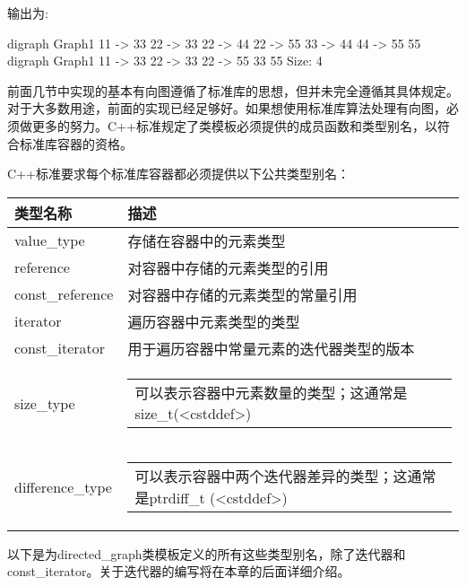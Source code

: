 输出为:

\begin{shell}
digraph Graph1 {
11 -> 33
22 -> 33
22 -> 44
22 -> 55
33 -> 44
44 -> 55
55
}
digraph Graph1 {
11 -> 33
22 -> 33
22 -> 55
33
55
}
Size: 4
\end{shell}


前面几节中实现的基本有向图遵循了标准库的思想，但并未完全遵循其具体规定。对于大多数用途，前面的实现已经足够好。如果想使用标准库算法处理有向图，必须做更多的努力。C++标准规定了类模板必须提供的成员函数和类型别名，以符合标准库容器的资格。


C++标准要求每个标准库容器都必须提供以下公共类型别名：

\begin{longtable}{|l|l|}
\hline
\textbf{类型名称} & \textbf{描述}                                                     \\ \hline
\endfirsthead
%
\endhead
%
value\_type        & 存储在容器中的元素类型                                               \\ \hline
reference          & 对容器中存储的元素类型的引用                                         \\ \hline
const\_reference   & 对容器中存储的元素类型的常量引用                                     \\ \hline
iterator           & 遍历容器中元素类型的类型                                             \\ \hline
const\_iterator    & 用于遍历容器中常量元素的迭代器类型的版本                               \\ \hline
size\_type &
\begin{tabular}[c]{@{}l@{}}可以表示容器中元素数量的类型；这通常是size\_t(<cstddef>)\end{tabular} \\ \hline
difference\_type &
\begin{tabular}[c]{@{}l@{}}可以表示容器中两个迭代器差异的类型；这通常是ptrdiff\_t (<cstddef>)\end{tabular} \\ \hline
\end{longtable}

以下是为directed\_graph类模板定义的所有这些类型别名，除了迭代器和const\_iterator。关于迭代器的编写将在本章的后面详细介绍。

